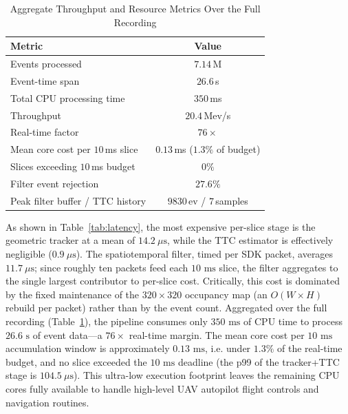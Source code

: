 \documentclass[conference]{IEEEtran}
\begin{document}
\begin{table}[htbp]
\caption{Aggregate Throughput and Resource Metrics Over the Full Recording}
\begin{center}
\begin{tabular}{|l|c|}
\hline
\textbf{Metric} & \textbf{Value} \\
\hline
Events processed              & $7.14$\,M \\
Event-time span               & $26.6$\,s \\
Total CPU processing time     & $350$\,ms \\
Throughput                    & $20.4$\,Mev/s \\
Real-time factor              & $76\times$ \\
Mean core cost per $10$\,ms slice & $0.13$\,ms ($1.3\%$ of budget) \\
Slices exceeding $10$\,ms budget  & $0\%$ \\
Filter event rejection        & $27.6\%$ \\
Peak filter buffer / TTC history  & $9830$\,ev / $7$\,samples \\
\hline
\end{tabular}
\label{tab:aggregate}
\end{center}
\end{table}

As shown in Table~\ref{tab:latency}, the most expensive per-slice stage is the geometric tracker at a mean of $14.2\ \mu\text{s}$, while the TTC estimator is effectively negligible ($0.9\ \mu\text{s}$). The spatiotemporal filter, timed per SDK packet, averages $11.7\ \mu\text{s}$; since roughly ten packets feed each $10\text{ ms}$ slice, the filter aggregates to the single largest contributor to per-slice cost. Critically, this cost is dominated by the fixed maintenance of the $320 \times 320$ occupancy map (an $O(W \times H)$ rebuild per packet) rather than by the event count. Aggregated over the full recording (Table~\ref{tab:aggregate}), the pipeline consumes only $350\text{ ms}$ of CPU time to process $26.6\text{ s}$ of event data---a $76\times$ real-time margin. The mean core cost per $10\text{ ms}$ accumulation window is approximately $0.13\text{ ms}$, i.e. under $1.3\%$ of the real-time budget, and no slice exceeded the $10\text{ ms}$ deadline (the p99 of the tracker+TTC stage is $104.5\ \mu\text{s}$). This ultra-low execution footprint leaves the remaining CPU cores fully available to handle high-level UAV autopilot flight controls and navigation routines.
\end{document}
